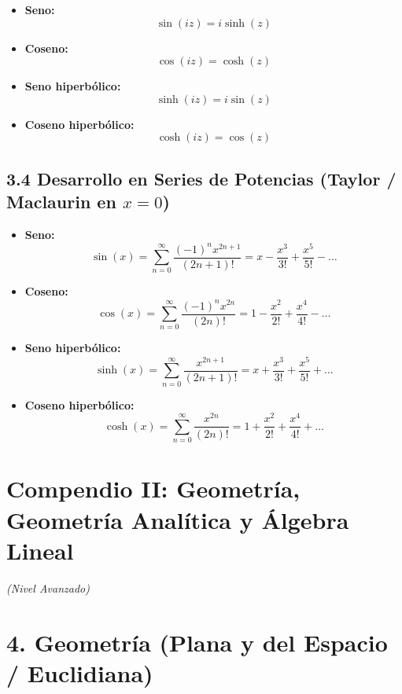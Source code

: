 \documentclass[11pt,a4paper]{article}
\begin{document}
\begin{itemize}
  \item \textbf{Seno:}
  \[
    \sin(iz) = i\sinh(z)
  \]
  \item \textbf{Coseno:}
  \[
    \cos(iz) = \cosh(z)
  \]
  \item \textbf{Seno hiperbólico:}
  \[
    \sinh(iz) = i\sin(z)
  \]
  \item \textbf{Coseno hiperbólico:}
  \[
    \cosh(iz) = \cos(z)
  \]
\end{itemize}

\subsection*{3.4 Desarrollo en Series de Potencias (Taylor / Maclaurin en $x = 0$)}

\begin{itemize}
  \item \textbf{Seno:}
  \[
    \sin(x) = \sum_{n=0}^\infty \frac{(-1)^n x^{2n+1}}{(2n+1)!} = x - \frac{x^3}{3!} + \frac{x^5}{5!} - \dots
  \]
  \item \textbf{Coseno:}
  \[
    \cos(x) = \sum_{n=0}^\infty \frac{(-1)^n x^{2n}}{(2n)!} = 1 - \frac{x^2}{2!} + \frac{x^4}{4!} - \dots
  \]
  \item \textbf{Seno hiperbólico:}
  \[
    \sinh(x) = \sum_{n=0}^\infty \frac{x^{2n+1}}{(2n+1)!} = x + \frac{x^3}{3!} + \frac{x^5}{5!} + \dots
  \]
  \item \textbf{Coseno hiperbólico:}
  \[
    \cosh(x) = \sum_{n=0}^\infty \frac{x^{2n}}{(2n)!} = 1 + \frac{x^2}{2!} + \frac{x^4}{4!} + \dots
  \]
\end{itemize}

\section*{Compendio II: Geometría, Geometría Analítica y Álgebra Lineal}

\textit{(Nivel Avanzado)}

\section*{4. Geometría (Plana y del Espacio / Euclidiana)}
\end{document}
